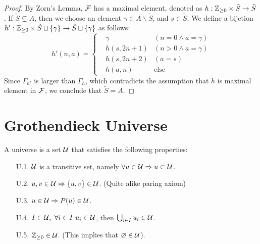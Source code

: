 \begin{proof}
  By Zorn's Lemma, ${\cal F}$ has a maximal element, denoted as $h: \mathbb Z_{\geq 0} \times \tilde{S} \to \tilde{S}$. If $\tilde{S} \subsetneq A$, then we choose an element $\gamma \in A \smallsetminus \tilde{S}$, and $s \in \tilde{S}$. We define a bijction $h': \mathbb Z_{\geq 0} \times \tilde{S} \sqcup \{ \gamma \} \to \tilde{S} \sqcup \{ \gamma \}$ as follows:
  \begin{equation*}
    h'(n, a) = \left\{
      \begin{aligned}
        & \gamma &(n=0 \land a = \gamma) \\
        & h(s, 2n+1) &(n>0 \land a = \gamma ) \\
        & h(s, 2n+2) &(a = s) \\
        & h(a, n) &\text{else}
      \end{aligned} 
    \right.
  \end{equation*}
  Since $\Gamma_{h'}$ is larger than $\Gamma_h$, which contradicts the assumption that $h$ is maximal element in ${\cal F}$, we conclude that $\tilde{S} = A$.
\end{proof}











\section{Grothendieck Universe}

\begin{definition}
  A universe is a set ${\cal U}$ that satisfies the following properties:
  \begin{enumerate}
    \item[U.1.] ${\cal U}$ is a transitive set, namely $\forall u \in {\cal U} \Rightarrow u \subset {\cal U}$.
    \item[U.2.] $u, v \in {\cal U} \Rightarrow \{ u, v \} \in {\cal U}$. (Quite alike paring axiom)
    \item[U.3.] $u \in {\cal U} \Rightarrow P(u) \in {\cal U}$.
    \item[U.4.] $I \in {\cal U}, \ \forall i \in I\ u_i \in {\cal U}$, then $\bigcup_{i \in I}u_i \in {\cal U}$.
    \item[U.5.] $\mathbb Z_{\geq 0} \in {\cal U}$. (This implies that $\varnothing \in {\cal U}$).
  \end{enumerate}
\end{definition}

